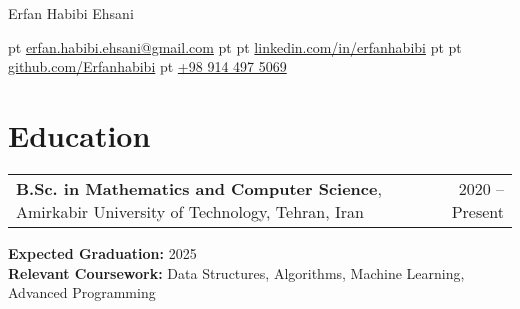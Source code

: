 \documentclass[10pt, a4paper]{article}
\newenvironment{header}{
    \centering
}{\par}
\begin{document}
\begin{header}
    \fontsize{25 pt}{25 pt}\selectfont Erfan Habibi Ehsani

    \vspace{5 pt}

    \normalsize
     pt%
    \href{mailto:erfan.habibi.ehsani@gmail.com}{erfan.habibi.ehsani@gmail.com}%
     pt%
    \textbar%
     pt%
    \href{https://www.linkedin.com/in/erfanhabibi/}{linkedin.com/in/erfanhabibi}%
     pt%
    \textbar%
     pt%
    \href{https://github.com/Erfanhabibi}{github.com/Erfanhabibi}%
    \textbar%
     pt%
    \href{tel:+989144975069}{+98 914 497 5069}
\end{header}

\vspace{10 pt}

\section{Education}

\begin{tabularx}{\textwidth}{Xr}
    \textbf{B.Sc. in Mathematics and Computer Science}, Amirkabir University of Technology, Tehran, Iran & 2020 -- Present \\
\end{tabularx}

\vspace{0.1 cm}

\textbf{Expected Graduation:} 2025 \\
\textbf{Relevant Coursework:} Data Structures, Algorithms, Machine Learning, Advanced Programming




\end{document}
